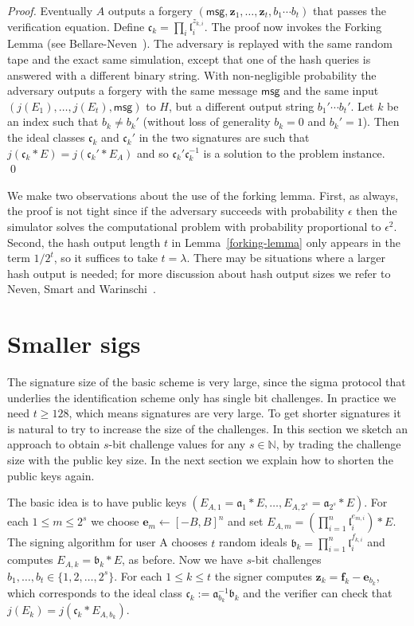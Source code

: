 \documentclass{llncs}
\newcommand{\N}{\mathbb{N}}
\newcommand{\msg}{\textsf{msg}}
\renewcommand{\a}{\mathfrak{a}}
\renewcommand{\b}{\mathfrak{b}}
\renewcommand{\c}{\mathfrak{c}}
\renewcommand{\l}{\mathfrak{l}}
\newcommand{\e}{\textbf{e}}
\newcommand{\f}{\textbf{f}}
\newcommand{\z}{\textbf{z}}
\begin{document}
\begin{proof}
\vskip 0.1cm

Eventually $A$ outputs a forgery $(\msg, \z_1, \dots, \z_t, b_1\cdots b_t)$ that passes the verification equation.
Define $\c_k = \prod_i \l_i^{z_{k,i}}$.
The proof now invokes the Forking Lemma (see Bellare-Neven~\cite{BN06}). The adversary is replayed with the same random tape and the exact same simulation, except that one of the hash queries is answered with a different binary string.
With non-negligible probability the adversary outputs a forgery with the same message $\msg$ and the same input $(j(E_1), \dots, j(E_t), \msg)$ to $H$, but a different output string $b_1'\cdots b_t'$. Let $k$ be an index such that $b_k \ne b_k'$ (without loss of generality $b_k = 0$ and $b_k' = 1$). Then the ideal classes $\c_k$ and $\c_k'$ in the two signatures are such that $j( \c_k * E ) = j( \c_k' * E_A )$ and so $\c_k' \c_k^{-1}$ is a solution to the problem instance. \qed
\end{proof}


We make two observations about the use of the forking lemma.
First, as always, the proof is not tight since if the adversary succeeds with probability $\epsilon$ then the simulator solves the computational problem with probability proportional to $\epsilon^2$.
Second, the hash output length $t$ in Lemma~\ref{forking-lemma} only appears in the term $1/2^t$, so it suffices to take $t = \lambda$.
There may be situations where a larger hash output is needed; for more discussion about hash output sizes we refer to Neven, Smart and Warinschi~\cite{NSW09}.





\section{Smaller sigs}\label{sec:smaller-sigs}


The signature size of the basic scheme is very large, since the sigma protocol that underlies the identification scheme only has single bit challenges. 
In practice we need $t \ge 128$, which means signatures are very large.
To get shorter signatures it is natural to try to increase the size of the challenges.
In this section we sketch an approach to obtain $s$-bit challenge values for any $s \in \N$, by trading the challenge size with the public key size. In the next section we explain how to shorten the public keys again.


The basic idea is to have public keys $( E_{A,1} = \a_1 * E , \dots , E_{A,2^s} = \a_{2^s} * E )$.
For each $1 \le m \le 2^s$ we choose $\e_m \leftarrow [-B,B]^n$ and set $E_{A,m} = ( \prod_{i=1}^n \l_i^{e_{m,i}} ) * E$.
The signing algorithm for user A chooses $t$ random ideals $\b_k = \prod_{i=1}^n \l_i^{f_{k,i}}$ and computes $E_{A,k} = \b_k * E$, as before.
Now we have $s$-bit challenges $b_1, \dots, b_t \in \{1, 2, \dots, 2^s \}$.
For each $1 \le k \le t$ the signer computes $\z_k = \f_k - \e_{b_k}$, which corresponds to the ideal class $\c_k := \a_{b_k}^{-1} \b_k$ and the verifier can check that $j( E_k ) = j( \c_k * E_{A, b_k})$.
\end{document}
